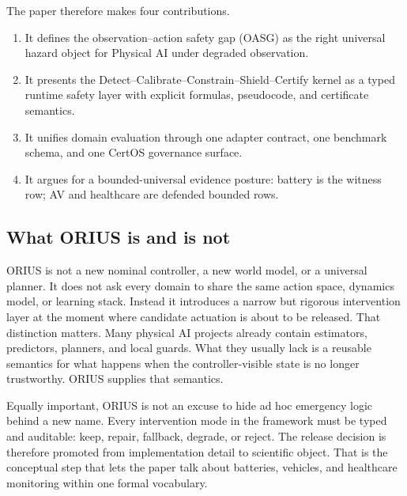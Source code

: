 The paper therefore makes four contributions.
\begin{enumerate}[leftmargin=1.25em,itemsep=0.2em]
  \item It defines the observation--action safety gap (OASG) as the right universal
  hazard object for Physical AI under degraded observation.
  \item It presents the Detect--Calibrate--Constrain--Shield--Certify kernel as a typed
  runtime safety layer with explicit formulas, pseudocode, and certificate semantics.
  \item It unifies domain evaluation through one adapter contract, one benchmark schema,
  and one CertOS governance surface.
  \item It argues for a bounded-universal evidence posture: battery is the witness row;
  AV and healthcare are defended bounded rows.
\end{enumerate}

\subsection{What ORIUS is and is not}
ORIUS is not a new nominal controller, a new world model, or a universal planner.
It does not ask every domain to share the same action space, dynamics model, or
learning stack. Instead it introduces a narrow but rigorous intervention layer at the
moment where candidate actuation is about to be released. That distinction matters.
Many physical AI projects already contain estimators, predictors, planners, and local
guards. What they usually lack is a reusable semantics for what happens when the
controller-visible state is no longer trustworthy. ORIUS supplies that semantics.

Equally important, ORIUS is not an excuse to hide ad hoc emergency logic behind a new
name. Every intervention mode in the framework must be typed and auditable: keep,
repair, fallback, degrade, or reject. The release decision is therefore promoted from
implementation detail to scientific object. That is the conceptual step that lets the
paper talk about batteries, vehicles, and healthcare monitoring within one formal vocabulary.

